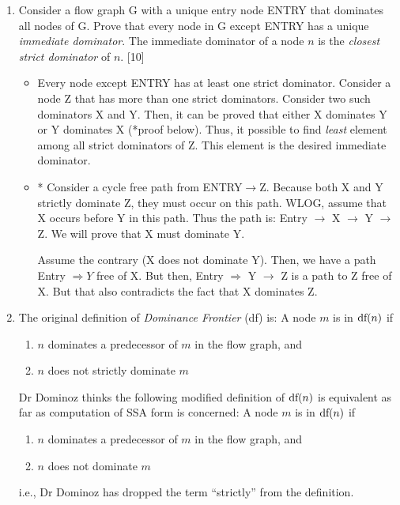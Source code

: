 \documentclass[12pt]{article}
\newcommand{\answer}[1]{{{\blue #1}}}
\begin{document}
\begin{enumerate}
\item Consider a flow graph G with a unique entry node ENTRY that
  dominates all nodes of G. Prove that every node in G except
  ENTRY has a unique {\em immediate dominator}. The
  immediate dominator of a node $n$ is the {\em closest strict
    dominator} of $n$.  \hfill[10]


  \answer{
  \begin{itemize}
  \item Every node except ENTRY has at least one strict
    dominator. Consider a node Z that has more than one strict
    dominators. Consider two such dominators X and Y. Then, it
    can be proved that either X dominates Y or Y dominates X
    (*proof below). Thus, it possible to find {\em least} element
    among all strict dominators of Z. This element is the desired
    immediate dominator.
  \item * Consider a cycle free path from
    ENTRY$\rightarrow$Z. Because both X and Y strictly
    dominate Z, they must occur on this path. WLOG, assume
    that X occurs before Y in this path.  Thus the path is:
    Entry $\rightarrow$ X $\rightarrow$ Y $\rightarrow$ Z. We
    will prove that X must dominate Y.

    Assume the contrary (X does not dominate Y). Then, we
    have a path Entry $\Rightarrow Y$ free of X. But then,
    Entry $\Rightarrow$ Y $\rightarrow$ Z is a path to Z free
    of X. But that also contradicts the fact that X dominates
    Z.
  \end{itemize}
}

\newcommand{\df}{\mbox{\rm df}}
\item The original definition of {\em Dominance Frontier} (\df) is:
A node $m$ is in $\df(n)$ if
\begin{enumerate}
\item $n$ dominates a predecessor of $m$ in the flow graph, and
\item $n$ does not strictly dominate $m$
\end{enumerate}
Dr Dominoz thinks the following modified definition of $\df(n)$ is equivalent as far as computation of SSA form is concerned: A node $m$ is in $\df(n)$ if
\begin{enumerate}
\item $n$ dominates a predecessor of $m$ in the flow graph, and
\item $n$ does not dominate $m$
\end{enumerate}
i.e., Dr Dominoz has dropped the term ``strictly'' from the
definition.


\end{enumerate}
\end{document}
